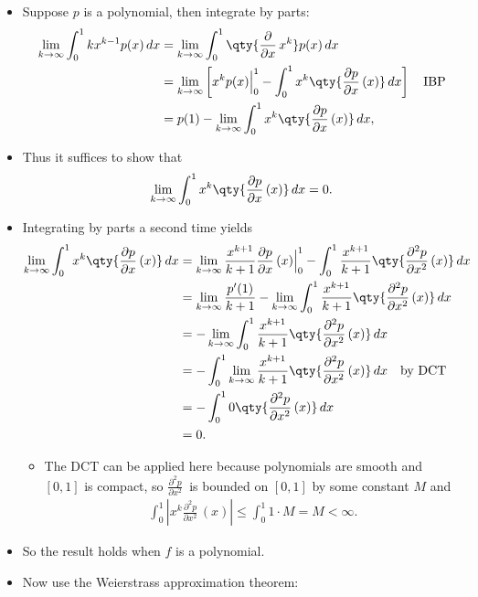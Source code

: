 \begin{solution}

\envlist

\begin{itemize}
\item
  Suppose \(p\) is a polynomial, then integrate by parts:
  \begin{align*}
  \lim_{k\to\infty} \int_0^1 kx^{k-1} p(x) \, dx
  &= \lim_{k\to\infty} \int_0^1 \qty{ {\frac{\partial }{\partial x}\,}x^k } p(x) \, dx \\
  &= \lim_{k\to\infty} \left[ x^k p(x) \Big|_0^1 - \int_0^1 x^k \qty{{\frac{\partial p}{\partial x}\,}(x) } \, dx \right] \quad\text{IBP}\\
  &= p(1) - \lim_{k\to\infty} \int_0^1 x^k \qty{{\frac{\partial p}{\partial x}\,}(x) } \, dx
  ,\end{align*}
\item
  Thus it suffices to show that
  \begin{align*}
  \lim_{k\to\infty} \int_0^1 x^k \qty{{\frac{\partial p}{\partial x}\,} (x) } \, dx = 0
  .\end{align*}
\item
  Integrating by parts a second time yields
  \begin{align*}
  \lim_{k\to\infty} 
  \int_0^1 x^k \qty{{\frac{\partial p}{\partial x}\,}(x) } \, dx
  &= \lim_{k\to\infty} 
  {x^{k+1} \over k+1} {\frac{\partial p}{\partial x}\,}(x) \Big|_0^1 - \int_0^1 {x^{k+1} \over k+1} \qty{ {\frac{\partial ^2 p}{\partial x^2}\,}(x)} \, dx \\
  &= \lim_{k\to\infty} {p'(1) \over k+1} - \lim_{k\to\infty} \int_0^1 {x^{k+1} \over k+1} \qty{ {\frac{\partial ^2p}{\partial x^2}\,}(x)} \, dx \\
  &= - \lim_{k\to\infty} \int_0^1 {x^{k+1} \over k+1} \qty{ {\frac{\partial ^2p}{\partial x^2}\,}(x)} \, dx \\
  &= - \int_0^1 \lim_{k\to\infty}  {x^{k+1} \over k+1} \qty{ {\frac{\partial ^2p}{\partial x^2}\,}(x)} \, dx \quad\text{by DCT} \\
  &= - \int_0^1 0 \qty{ {\frac{\partial ^2p}{\partial x^2}\,}(x)} \, dx \\
  &= 0
  .\end{align*}

  \begin{itemize}
  \tightlist
  \item
    The DCT can be applied here because polynomials are smooth and
    \([0, 1]\) is compact, so \({\frac{\partial ^2 p}{\partial x^2}\,}\)
    is bounded on \([0, 1]\) by some constant \(M\) and
    \begin{align*} \int_0^1 {\left\lvert {x^k {\frac{\partial ^2 p}{\partial x^2}\,} (x)} \right\rvert} \leq \int_0^1 1\cdot M = M < \infty.\end{align*}
  \end{itemize}
\item
  So the result holds when \(f\) is a polynomial.
\item
  Now use the Weierstrass approximation theorem:


\end{itemize}
\end{solution}
